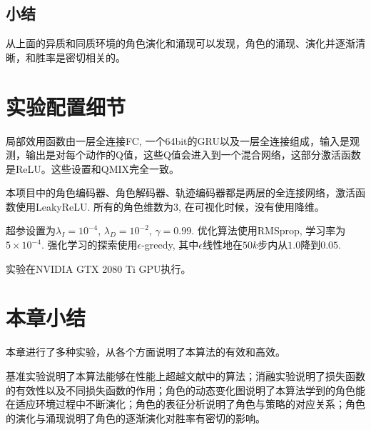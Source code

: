 \subsection{小结}
从上面的异质和同质环境的角色演化和涌现可以发现，角色的涌现、演化并逐渐清晰，和胜率是密切相关的。

\section{实验配置细节}\label{sec:exp-detail}
局部效用函数由一层全连接FC, 一个64bit的GRU以及一层全连接组成，输入是观测，输出是对每个动作的Q值，这些Q值会进入到一个混合网络，这部分激活函数是ReLU。这些设置和QMIX完全一致。

本项目中的角色编码器、角色解码器、轨迹编码器都是两层的全连接网络，激活函数使用LeakyReLU. 所有的角色维数为3, 在可视化时候，没有使用降维。

超参设置为$\lambda_I=10^{-4}$, $\lambda_D=10^{-2}$, $\gamma=0.99$. 优化算法使用RMSprop, 学习率为$5\times 10^{-4}$. 强化学习的探索使用$\epsilon$-greedy, 其中$\epsilon$线性地在$50k$步内从$1.0$降到$0.05$. 

实验在NVIDIA GTX 2080 Ti GPU执行。

\section{本章小结}

本章进行了多种实验，从各个方面说明了本算法的有效和高效。

基准实验说明了本算法能够在性能上超越文献中的算法；消融实验说明了损失函数的有效性以及不同损失函数的作用；角色的动态变化图说明了本算法学到的角色能在适应环境过程中不断演化；角色的表征分析说明了角色与策略的对应关系；角色的演化与涌现说明了角色的逐渐演化对胜率有密切的影响。